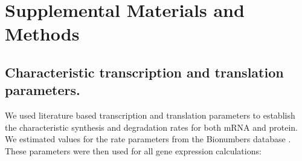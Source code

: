 \nolinenumbers
\section*{Supplemental Materials and Methods}

\subsection*{Characteristic transcription and translation parameters.}
We used literature based transcription and translation parameters to establish the characteristic synthesis and degradation rates for both mRNA and protein.
We estimated values for the rate parameters from the Bionumbers database \citep{Milo:2010aa}. These parameters were then used for all gene
expression calculations:

\lstset{basicstyle=\tiny,style=myCustomMatlabStyle}
